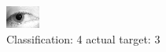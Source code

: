 \begin{figure}[h!]
\begin{center}
\includegraphics[width=0.60\columnwidth]{figures/ID1280_class_4_target_3.png}
\end{center}
\caption{ Classification: 4 actual target: 3}
\label{fig:ID1280_class_4_target_3}
\end{figure}
